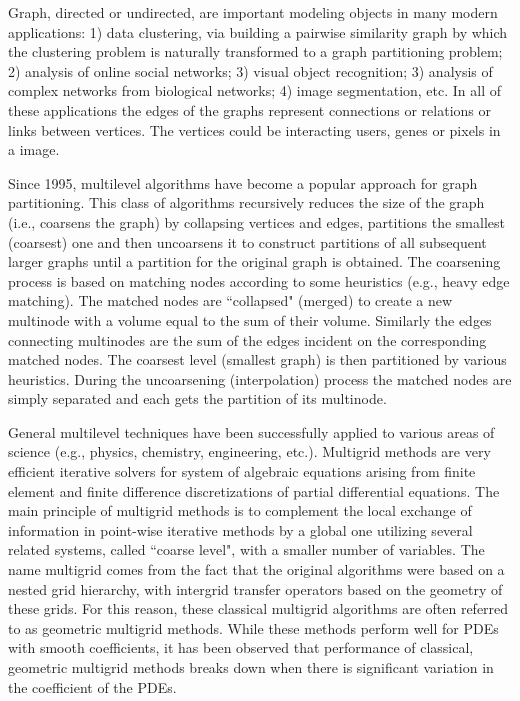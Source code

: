 \documentclass[12pt,letterpaper]{article}
\begin{document}
Graph, directed or undirected, are important modeling objects in many modern applications: 1) data clustering, via building a pairwise similarity graph by which the clustering problem is naturally transformed to a graph partitioning problem; 2) analysis of online social networks; 3) visual object recognition; 3) analysis of complex networks from biological networks; 4) image segmentation, etc. In all of these applications the edges of the graphs represent connections or relations or links between vertices. The vertices could be interacting users, genes or pixels in a image.

Since 1995, multilevel algorithms have become a popular approach for graph partitioning. This class of algorithms recursively reduces the size of the graph (i.e., coarsens the graph) by collapsing vertices and edges, partitions the smallest (coarsest) one and then uncoarsens it to construct partitions of all subsequent larger graphs until a partition for the original graph is obtained. The coarsening process is based on matching nodes according to some heuristics (e.g., heavy edge matching). The matched nodes are ``collapsed" (merged) to create a new multinode with a volume equal to the sum of their volume. Similarly the edges connecting multinodes are the sum of the edges incident on the corresponding matched nodes. The coarsest level (smallest graph) is then partitioned by various heuristics. During the uncoarsening (interpolation) process the matched nodes are simply separated and each gets the partition of its multinode. 

General multilevel techniques have been successfully applied to various areas of science (e.g., physics, chemistry, engineering, etc.). Multigrid methods are very efficient iterative solvers for system of algebraic equations arising from finite element and finite difference discretizations of partial differential equations. The main principle of multigrid methods is to complement the local exchange of information in point-wise iterative methods by a global one utilizing several related systems, called ``coarse level", with a smaller number of variables.
The name multigrid comes from the fact that the original algorithms were based on a nested grid hierarchy, with intergrid transfer operators based on the geometry of these grids. For this reason, these classical multigrid algorithms are often referred to as geometric multigrid methods. While these methods perform well for PDEs with smooth coefficients, it has been observed 
that performance of classical, geometric multigrid methods breaks down when there is significant variation in the coefficient of the PDEs. 
\end{document}
